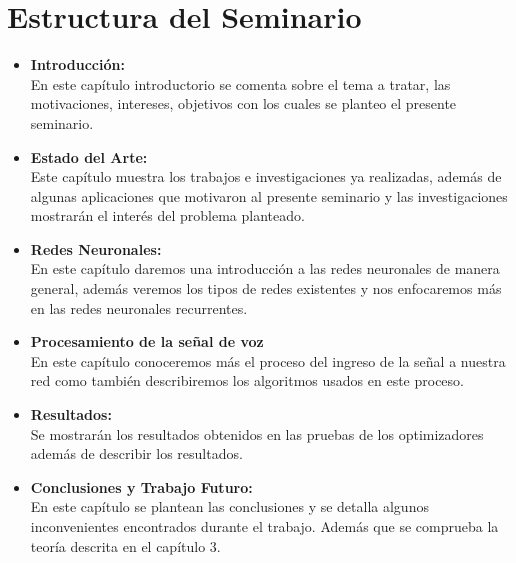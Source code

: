 \section{Estructura del Seminario}


\begin{itemize}

\item \textbf{Introducción:} \\
En este capítulo introductorio se comenta sobre el tema a tratar, las motivaciones, intereses, objetivos con los cuales se planteo el presente seminario.

\item \textbf{Estado del Arte:} \\
Este capítulo muestra los trabajos e investigaciones ya realizadas, además de algunas aplicaciones que motivaron al presente seminario y las investigaciones mostrarán el interés del problema planteado.

\item \textbf{Redes Neuronales:} \\
En este capítulo daremos una introducción a las redes neuronales de manera general, además veremos los tipos de redes existentes y nos enfocaremos más en las redes neuronales recurrentes.
\item \textbf{Procesamiento de la señal de voz} \\
En este capítulo conoceremos más el proceso del ingreso de la señal a nuestra red como también describiremos los algoritmos usados en este proceso.
\item \textbf{Resultados:} \\
Se mostrarán los resultados obtenidos en las pruebas de los optimizadores además de describir los resultados.
\item \textbf{Conclusiones y Trabajo Futuro:} \\
En este capítulo se plantean las conclusiones y se detalla algunos inconvenientes encontrados durante el trabajo. Además que se comprueba la teoría descrita en el capítulo 3.


\end{itemize}



